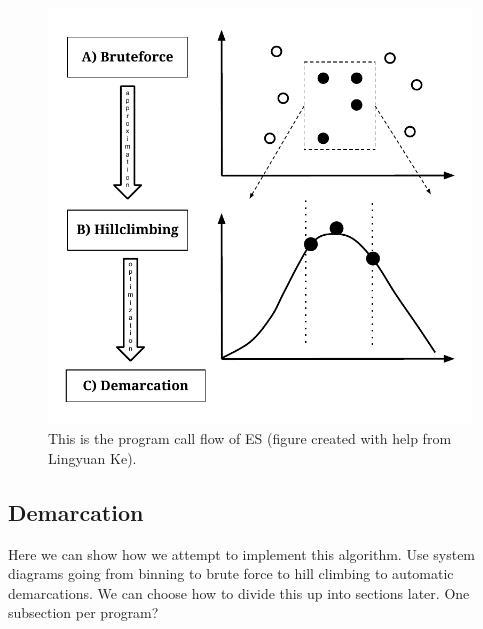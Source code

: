 \begin{figure}[h!]
 \centering
 \label{fig:Flow}
 \includegraphics[scale=0.75]{images/ESFlow-CH2.pdf}
 \caption[Ecotype Simulation program flow diagram.]{This is the program call flow of ES (figure created with help from Lingyuan Ke). }
\end{figure}

\subsection*{Demarcation}

Here we can show how we attempt to implement this algorithm. Use system diagrams going from binning to brute force to hill climbing to automatic demarcations. We can choose how to divide this up into sections later. One subsection per program?